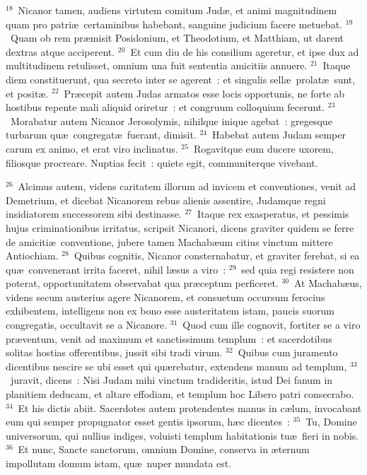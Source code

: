 ${}^{18}$~Nicanor tamen, audiens virtutem comitum Jud\ae , et animi magnitudinem quam pro patri\ae\ certaminibus habebant, sanguine judicium facere metuebat.
${}^{19}$~Quam ob rem pr\ae misit Posidonium, et Theodotium, et Matthiam, ut darent dextras atque acciperent.
${}^{20}$~Et cum diu de his consilium ageretur, et ipse dux ad multitudinem retulisset, omnium una fuit sententia amicitiis annuere.
${}^{21}$~Itaque diem constituerunt, qua secreto inter se agerent~: et singulis sell\ae\ prolat\ae\ sunt, et posit\ae .
${}^{22}$~Pr\ae cepit autem Judas armatos esse locis opportunis, ne forte ab hostibus repente mali aliquid oriretur~: et congruum colloquium fecerunt.
${}^{23}$~Morabatur autem Nicanor Jerosolymis, nihilque inique agebat~: gregesque turbarum qu\ae\ congregat\ae\ fuerant, dimisit.
${}^{24}$~Habebat autem Judam semper carum ex animo, et erat viro inclinatus.
${}^{25}$~Rogavitque eum ducere uxorem, filiosque procreare. Nuptias fecit~: quiete egit, communiterque vivebant.


${}^{26}$~Alcimus autem, videns caritatem illorum ad invicem et conventiones, venit ad Demetrium, et dicebat Nicanorem rebus alienis assentire, Judamque regni insidiatorem successorem sibi destinasse.
${}^{27}$~Itaque rex exasperatus, et pessimis hujus criminationibus irritatus, scripsit Nicanori, dicens graviter quidem se ferre de amiciti\ae\ conventione, jubere tamen Machab\ae um citius vinctum mittere Antiochiam.
${}^{28}$~Quibus cognitis, Nicanor consternabatur, et graviter ferebat, si ea qu\ae\ convenerant irrita faceret, nihil l\ae sus a viro~:
${}^{29}$~sed quia regi resistere non poterat, opportunitatem observabat qua pr\ae ceptum perficeret.
${}^{30}$~At Machab\ae us, videns secum austerius agere Nicanorem, et consuetum occursum ferocius exhibentem, intelligens non ex bono esse austeritatem istam, paucis suorum congregatis, occultavit se a Nicanore.
${}^{31}$~Quod cum ille cognovit, fortiter se a viro pr\ae ventum, venit ad maximum et sanctissimum templum~: et sacerdotibus solitas hostias offerentibus, jussit sibi tradi virum.
${}^{32}$~Quibus cum juramento dicentibus nescire se ubi esset qui qu\ae rebatur, extendens manum ad templum,
${}^{33}$~juravit, dicens~: Nisi Judam mihi vinctum tradideritis, istud Dei fanum in planitiem deducam, et altare effodiam, et templum hoc Libero patri consecrabo.
${}^{34}$~Et his dictis abiit. Sacerdotes autem protendentes manus in c\ae lum, invocabant eum qui semper propugnator esset gentis ipsorum, h\ae c dicentes~:
${}^{35}$~Tu, Domine universorum, qui nullius indiges, voluisti templum habitationis tu\ae\ fieri in nobis.
${}^{36}$~Et nunc, Sancte sanctorum, omnium Domine, conserva in \ae ternum impollutam domum istam, qu\ae\ nuper mundata est.


